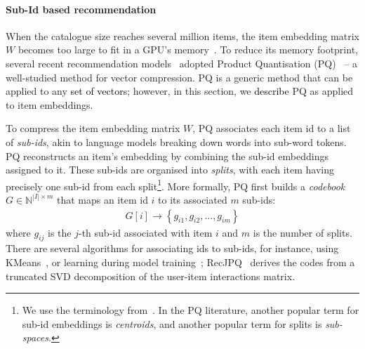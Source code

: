 \documentclass[sigconf,natbib=true, review=False]{acmart} %
\newcommand{\pageenlarge}[1]{\marginnote{#1}\enlargethispage{#1\baselineskip}}
\newcommand{\nt}[1]{\textcolor{black}{#1}}
\newcommand{\scrc}[1]{\textcolor[HTML]{000000}{#1}}
\begin{document}
 \vspace{-0.5\baselineskip}





 \paragraph{Sub-Id based recommendation}\label{ssec:recjpq} When the catalogue size reaches several million items, the item embedding matrix $W$ becomes too large to fit in a GPU's memory~\cite{petrovRecJPQTrainingLargeCatalogue2024}. To reduce its memory footprint, several recent recommendation \scrc{models~\cite{petrovRecJPQTrainingLargeCatalogue2024, liuVectorQuantizationRecommender2024}} adopted Product Quantisation (PQ)~\cite{jegouProductQuantizationNearest2011} -- a well-studied method for vector compression. PQ is a generic method that can be applied to any \nt{set of vectors}; however, in this section, we \nt{describe} PQ as applied to item embeddings. 

 To compress the item embedding matrix $W$, PQ associates each item id to a list of {\em sub-ids}, akin to language models breaking down words into sub-word tokens. PQ reconstructs an item's embedding by combining the sub-id embeddings assigned to it. These sub-ids are organised into {\em splits}, with each item having precisely one sub-id from each split\footnote{We use the terminology from~\cite{petrovRecJPQTrainingLargeCatalogue2024}. In the PQ literature, another popular term for sub-id embeddings is \emph{centroids}, and another popular term for splits is \emph{sub-spaces}.}. More formally, PQ first builds a \emph{codebook} $G\in\mathbb{N}^{|I|\times m}$ that maps an item id $i$ to its associated $m$ sub-ids:
\begin{align}
    G[i] \rightarrow \left\{g_{i1}, g_{i2}, ..., g_{im}\right\} \label{eq:sub_ids_map}
\end{align}
where $g_{ij}$ is the $j$-th sub-id associated with item $i$ and $m$ is the number of splits. There are several algorithms for associating ids to sub-ids, for instance, using KMeans~\cite{jegouProductQuantizationNearest2011}, or learning during model training~\cite{chenDifferentiableProductQuantization2020}; 
RecJPQ~\cite{petrovRecJPQTrainingLargeCatalogue2024} derives the codes from a truncated SVD decomposition of the user-item interactions matrix. 
\end{document}
